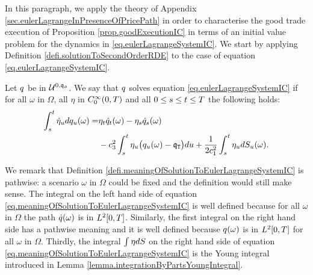 \documentclass[10pt,a4paper]{article}
\begin{document}
In this  paragraph, we apply the theory of Appendix \ref{sec.eulerLagrangeInPresenceOfPricePath} in order to characterise the good trade execution of Proposition \ref{prop.goodExecutionIC} in terms of an initial value problem for the dynamics in \eqref{eq.eulerLagrangeSystemIC}. We start by applying Definition \ref{defi.solutionToSecondOrderRDE} to the case of equation \eqref{eq.eulerLagrangeSystemIC}.
\begin{defi}\label{defi.meaningOfSolutionToEulerLagrangeSystemIC}
Let $q$ be in $\mathcal{U}^{0,\mathfrak{q_0}}$. We say that $q$ solves equation \eqref{eq.eulerLagrangeSystemIC} if for all $\omega$ in $\Omega$, all $\eta$ in $C^{\infty}_{0} (0,T)$ and all $0\leq s\leq t \leq T$ the following holds:
\begin{equation}
\label{eq.meaningOfSolutionToEulerLagrangeSystemIC}
\begin{split}
\int_{s}^{t} \dot{\eta}_u dq_u (\omega) 
=& \eta_t \dot{q}_{t}(\omega) - \eta_s \dot{q}_s (\omega) \\
& - c_{3}^{2} 	\int_{s}^{t} \eta_u \big(q_u (\omega) - \mathfrak{q}_{\mathtt{T} }\big) du 
+ \frac{1}{2c_{1}^{2}} 	\int_{s}^{t} \eta_{u} dS_u (\omega).
\end{split}
\end{equation}
\end{defi}
We remark that Definition \ref{defi.meaningOfSolutionToEulerLagrangeSystemIC} is pathwise: a scenario $\omega$ in $\Omega$ could be fixed and the definition would still make sense. The integral on the left hand side of equation \eqref{eq.meaningOfSolutionToEulerLagrangeSystemIC} is well defined because for all $\omega$ in $\Omega$ the path $\dot{q}(\omega)$ is in $L^{2} {[0,T]}$. Similarly, the first integral on the right hand side has a pathwise meaning and it is well defined because $q(\omega)$ is in $L^{2} {[0,T]}$ for all  $\omega$ in $\Omega$. Thirdly, the integral $\int \eta dS$ on the right hand side of equation \eqref{eq.meaningOfSolutionToEulerLagrangeSystemIC} is the Young integral introduced in Lemma \ref{lemma.integrationByPartsYoungIntegral}.
\end{document}
